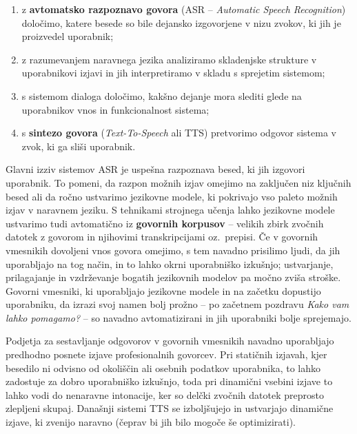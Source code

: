\begin{multicols}{2}
\begin{enumerate}
\item z \textbf{avtomatsko razpoznavo govora} (ASR – \textit{Automatic Speech Recognition}) določimo, katere besede so bile dejansko izgo\-vorjene v nizu zvokov, ki jih je proizvedel uporabnik;
\item z razumevanjem naravnega jezika analiziramo skladenjske strukture v uporabnikovi izjavi in jih interpretiramo v skladu s sprejetim sistemom;
\item s sistemom dialoga določimo, kakšno dejanje mora slediti glede na uporabnikov vnos in funkcionalnost sistema;
\item s \textbf{sintezo govora} (\textit{Text-To-Speech} ali TTS) pretvorimo odgo\-vor sistema v zvok, ki ga sliši uporabnik.
\end{enumerate}


Glavni izziv sistemov ASR je uspešna razpoznava besed, ki jih izgo\-vori uporabnik. To po\-meni, da razpon možnih izjav omejimo na zaključen niz ključnih besed ali da ročno ustvarimo jezikovne mo\-dele, ki pokrivajo vso paleto možnih izjav v narav\-nem jeziku. S tehnikami stroj\-nega učenja lahko jezikovne mo\-dele ustvarimo tudi avtomatično iz \textbf{govornih korpusov} – velikih zbirk zvočnih datotek z go\-vorom in njihovimi transkripcijami oz.~prepisi. Če v go\-vornih vmesnikih dovoljeni vnos go\-vora omejimo, s tem navadno prisilimo ljudi, da jih uporab\-ljajo na tog način, in to lahko okrni uporabniško izkušnjo; ustvarjanje, prilagajanje in vzdrževanje bogatih jezikovnih mo\-delov pa močno zviša stroške. Go\-vorni vmesniki, ki uporab\-ljajo jezikovne mo\-dele in na začetku dopustijo uporabniku, da izrazi svoj namen bolj prožno – po začetnem pozdravu \textit{Kako vam lahko pomagamo?} – so navadno avtomatizirani in jih uporabniki bolje sprejemajo.

Podjetja za sestav\-ljanje odgo\-vorov v go\-vornih vmesnikih navadno uporab\-ljajo predhodno posnete izjave profesionalnih go\-vorcev. Pri statičnih izjavah, kjer besedilo ni odvisno od okoliščin ali oseb\-nih podatkov uporabnika, to lahko zadostuje za dobro uporabniško izkušnjo, toda pri dinamični vsebini izjave to lahko vodi do nenaravne intonacije, ker so delčki zvočnih datotek preprosto zlepljeni skupaj. Današnji sistemi TTS se izboljšujejo  in ustvarjajo dinamične izjave, ki zvenijo naravno (čeprav bi jih bilo mogoče še optimizirati).



\end{multicols}
